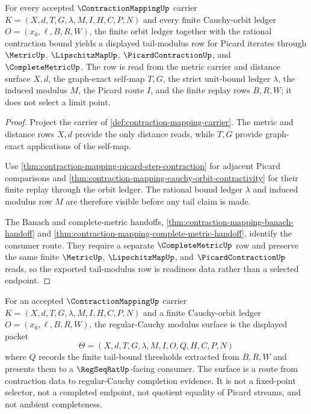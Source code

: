 \begin{theorem}
\label{thm:contraction-mapping-tail-modulus-readiness}
For every accepted $\ContractionMappingUp$ carrier $K=(X,d,T,G,\lambda,M,I,H,C,P,N)$ and every finite Cauchy-orbit ledger $O=(x_0,\ell,B,R,W)$, the finite orbit ledger together with the rational contraction bound yields a displayed tail-modulus row for Picard iterates through $\MetricUp$, $\LipschitzMapUp$, $\PicardContractionUp$, and $\CompleteMetricUp$. The row is read from the metric carrier and distance surface $X,d$, the graph-exact self-map $T,G$, the strict unit-bound ledger $\lambda$, the induced modulus $M$, the Picard route $I$, and the finite replay rows $B,R,W$; it does not select a limit point.
\end{theorem}
\begin{proof}
Project the carrier of \autoref{def:contraction-mapping-carrier}. The metric and distance rows $X,d$ provide the only distance reads, while $T,G$ provide graph-exact applications of the self-map.

Use \autoref{thm:contraction-mapping-picard-step-contraction} for adjacent Picard comparisons and \autoref{thm:contraction-mapping-cauchy-orbit-contractivity} for their finite replay through the orbit ledger. The rational bound ledger $\lambda$ and induced modulus row $M$ are therefore visible before any tail claim is made.

The Banach and complete-metric handoffs, \autoref{thm:contraction-mapping-banach-handoff} and \autoref{thm:contraction-mapping-complete-metric-handoff}, identify the consumer route. They require a separate $\CompleteMetricUp$ row and preserve the same finite $\MetricUp$, $\LipschitzMapUp$, and $\PicardContractionUp$ reads, so the exported tail-modulus row is readiness data rather than a selected endpoint.
\end{proof}

\begin{definition}
\label{def:contraction-mapping-regular-cauchy-modulus-surface}
For an accepted $\ContractionMappingUp$ carrier $K=(X,d,T,G,\lambda,M,I,H,C,P,N)$ and a finite Cauchy-orbit ledger $O=(x_0,\ell,B,R,W)$, the regular-Cauchy modulus surface is the displayed packet
$$
\Theta=(X,d,T,G,\lambda,M,I,O,Q,H,C,P,N)
$$
where $Q$ records the finite tail-bound thresholds extracted from $B,R,W$ and presents them to a $\RegSeqRatUp$-facing consumer. The surface is a route from contraction data to regular-Cauchy completion evidence. It is not a fixed-point selector, not a completed endpoint, not quotient equality of Picard streams, and not ambient completeness.
\end{definition}

